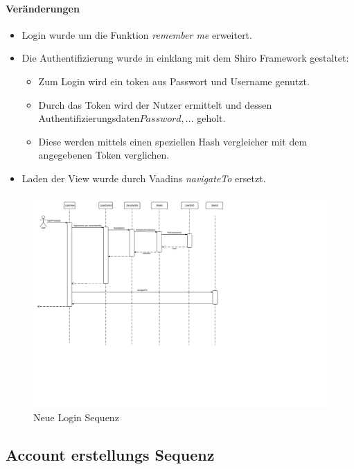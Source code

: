 \paragraph{Veränderungen}
\begin{itemize}
    \item Login wurde um die Funktion \emph{remember me} erweitert.
    \item Die Authentifizierung wurde in einklang mit dem Shiro Framework gestaltet:
    \begin{itemize}
        \item Zum Login wird ein token aus Passwort und Username genutzt.
        \item Durch das Token wird der Nutzer ermittelt und dessen Authentifizierungsdaten\(Password, ...\) geholt.
        \item Diese werden mittels einen speziellen Hash vergleicher mit dem angegebenen Token verglichen.
    \end{itemize}
    \item Laden der View wurde durch Vaadins \emph{navigateTo} ersetzt.
\end{itemize}

\begin{figure}
  \centering
    \includegraphics[width=\linewidth]{Login-Sequenz-new.svg}
   \caption{Neue Login Sequenz}
\end{figure}

\subsection{Account erstellungs Sequenz}


